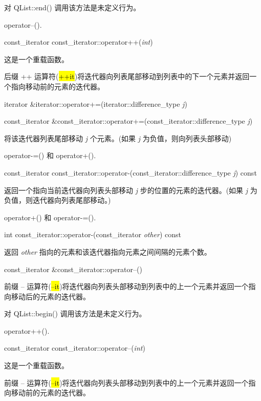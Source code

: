 对 QList::end() 调用该方法是未定义行为。

\begin{notice}[另请参见]
operator--().
\end{notice}

const\_iterator const\_iterator::operator++(\emph{int})

这是一个重载函数。

后缀 ++ 运算符(\hl{++it})将迭代器向列表尾部移动到列表中的下一个元素并返回一个指向移动前的元素的迭代器。

iterator \&iterator::operator+=(iterator::difference\_type \emph{j})

const\_iterator \&const\_iterator::operator+=(const\_iterator::difference\_type \emph{j})

将该迭代器列表尾部移动 \emph{j} 个元素。(如果 \emph{j} 为负值，则向列表头部移动)

\begin{notice}[另请参见]
operator-=() 和 operator+().
\end{notice}

const\_iterator const\_iterator::operator-(const\_iterator::difference\_type \emph{j}) const

返回一个指向当前迭代器向列表头部移动 \emph{j} 步的位置的元素的迭代器。(如果 \emph{j} 为负值，则迭代器向列表尾部移动。)

\begin{notice}[另请参见]
operator+() 和 operator-=().
\end{notice}

int const\_iterator::operator-(const\_iterator \emph{other}) const

返回 \emph{other} 指向的元素和该迭代器指向元素之间间隔的元素个数。

const\_iterator \&const\_iterator::operator--()

前缀 -- 运算符(\hl{--it})将迭代器向列表头部移动到列表中的上一个元素并返回一个指向移动后的元素的迭代器。

对 QList::begin() 调用该方法是未定义行为。


\begin{notice}[另请参见]
operator++().
\end{notice}


const\_iterator const\_iterator::operator--(\emph{int})

这是一个重载函数。

前缀 -- 运算符(\hl{--it})将迭代器向列表头部移动到列表中的上一个元素并返回一个指向移动前的元素的迭代器。


